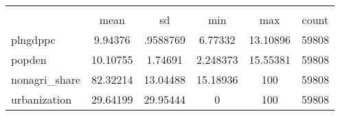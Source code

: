 {
\def\sym#1{\ifmmode^{#1}\else\(^{#1}\)\fi}
\begin{tabular}{l*{1}{ccccc}}
\hline\hline
               &\multicolumn{5}{c}{}                             \\
               &     mean&       sd&      min&      max&    count\\
\hline
plngdppc       &  9.94376& .9588769&  6.77332& 13.10896&    59808\\
popden         & 10.10755&  1.74691& 2.248373& 15.55381&    59808\\
nonagri\_share  & 82.32214& 13.04488& 15.18936&      100&    59808\\
urbanization   & 29.64199& 29.95444&        0&      100&    59808\\
\hline\hline
\end{tabular}
}
